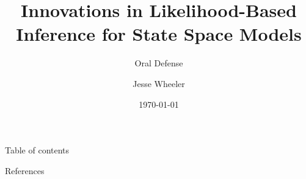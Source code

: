 \documentclass[aspectratio=169, 10pt]{beamer}\usepackage[]{graphicx}\usepackage[]{xcolor}
\title[]{Innovations in Likelihood-Based Inference for State Space Models}
\subtitle{Oral Defense}
\date[May 2025]{\today}
\author[Wheeler, J.]{Jesse Wheeler}
\institute{Department of Statistics, University of Michigan}
\newcommand{\themename}{\textbf{\textsc{Gotham}}}
\begin{document}
\maketitle

	\begin{frame}[toc]{Table of contents}%
		\tableofcontents%
	\end{frame}

	
% 











% 


% 
% 
% 
% 



  \begin{frame}[allowframebreaks]{References}
    
    
  \end{frame}
\end{document}
